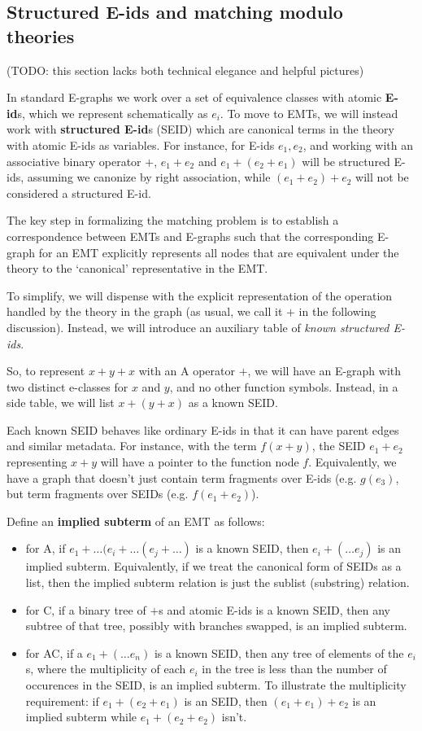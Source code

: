 \documentclass{article}
\theoremstyle{definition}
\begin{document}
\subsection{Structured E-ids and matching modulo theories}
(TODO: this section lacks both technical elegance and helpful pictures)

In standard E-graphs we work over a set of equivalence classes with atomic \textbf{E-id}s, which we represent schematically as $e_i$. To move to EMTs, we will instead work with \textbf{structured E-id}s (SEID) which are canonical terms in the theory with atomic E-ids as variables. For instance, for E-ids $e_1, e_2$, and working with an associative binary operator $+$, $e_1 + e_2$ and $e_1 + (e_2 + e_1)$ will be structured E-ids, assuming we canonize by right association, while $(e_1 + e_2) + e_2$ will not be considered a structured E-id.

The key step in formalizing the matching problem is to establish a correspondence between EMTs and E-graphs such that the corresponding E-graph for an EMT explicitly represents all nodes that are equivalent under the theory to the `canonical' representative in the EMT.

To simplify, we will dispense with the explicit representation of the operation handled by the theory in the graph (as usual, we call it $+$ in the following discussion). Instead, we will introduce an auxiliary table of \textit{known structured E-ids}.

So, to represent $x + y + x$ with an A operator $+$, we will have an E-graph with two distinct e-classes for $x$ and $y$, and no other function symbols. Instead, in a side table, we will list $x + (y + x)$ as a known SEID.

Each known SEID behaves like ordinary E-ids in that it can have parent edges and similar metadata. For instance, with the term $f(x + y)$, the SEID $e_1 + e_2$ representing $x + y$ will have a pointer to the function node $f$. Equivalently, we have a graph that doesn't just contain term fragments over E-ids (e.g. $g(e_3)$, but term fragments over SEIDs (e.g. $f(e_1 + e_2)$).

Define an \textbf{implied subterm} of an EMT as follows:
\begin{itemize}
	\item for A, if $e_1 + \ldots (e_i + \ldots (e_j + \ldots)$ is a known SEID, then $e_i + (\ldots e_j)$ is an implied subterm. Equivalently, if we treat the canonical form of SEIDs as a list, then the implied subterm relation is just the sublist (substring) relation.
	\item for C, if a binary tree of $+$s and atomic E-ids is a known SEID, then any subtree of that tree, possibly with branches swapped, is an implied subterm.
	\item for AC, if a $e_1 + (\ldots e_n)$ is a known SEID, then any tree of elements of the $e_i$s, where the multiplicity of each $e_i$ in the tree is less than the number of occurences in the SEID, is an implied subterm. To illustrate the multiplicity requirement: if $e_1 + (e_2 + e_1)$ is an SEID, then $(e_1 + e_1) + e_2$ is an implied subterm while $e_1 + (e_ 2 + e_2)$ isn't.
\end{itemize}
\end{document}
